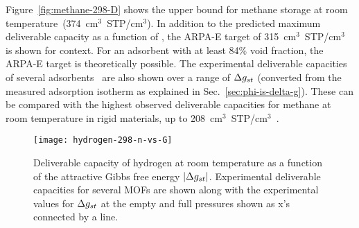 Figure~\ref{fig:methane-298-D} shows the upper bound for methane storage at room temperature~(374~cm$^3$~STP/cm$^3$). In addition to the predicted maximum deliverable capacity as a function of \gst,
the ARPA-E target of 315~cm$^3$~STP/cm$^3$~\cite{arpaemove} is shown for context. For an adsorbent with at least 84\% void fraction, the ARPA-E target is theoretically possible. The experimental deliverable capacities of several adsorbents~\cite{mason2014evaluating} are also shown over a range of $\Delta g_{st}$ (converted from the measured adsorption isotherm as explained in Sec.~\ref{sec:phi-is-delta-g}). These can be compared with the highest observed deliverable capacities for methane at room temperature in rigid materials, up to 208~cm$^3$~STP/cm$^3$~\cite{simon2015materials}. 

\begin{figure}
    \centering
    \texttt{[image: hydrogen-298-n-vs-G]}
    \caption{Deliverable capacity of hydrogen at room temperature as a function of the attractive Gibbs free energy $|\Delta g_{st}|$.  Experimental deliverable capacities for several MOFs are shown along with the experimental values for $\Delta g_{st}$ at the empty and full pressures shown as x's connected by a line.}
    \label{fig:hydrogen-298-D}
\end{figure}


